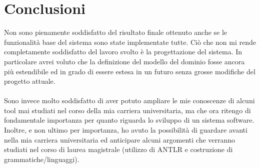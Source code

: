 \documentclass{article}
\begin{document}
  \section{Conclusioni}
  Non sono pienamente soddisfatto del risultato finale ottenuto anche se le funzionalità base del sistema sono state implementate tutte. Ciò che non mi rende
  completamente soddisfatto del lavoro svolto è la progettazione del sistema. In particolare avrei voluto che la definizione del modello del dominio fosse
  ancora più estendibile ed in grado di essere estesa in un futuro senza grosse modifiche del progetto attuale.\\
  \\Sono invece molto soddisfatto di aver potuto ampliare le mie conoscenze di alcuni tool mai studiati nel corso della mia carriera universitaria, ma che ora
  ritengo di fondamentale importanza per quanto riguarda lo sviluppo di un sistema software.\\
  Inoltre, e non ultimo per importanza, ho avuto la possibilità di guardare avanti nella mia carriera universitaria ed anticipare alcuni argomenti che verranno
  studiati nel corso di laurea magistrale (utilizzo di ANTLR e costruzione di grammatiche/linguaggi).
  \clearpage
\end{document}
